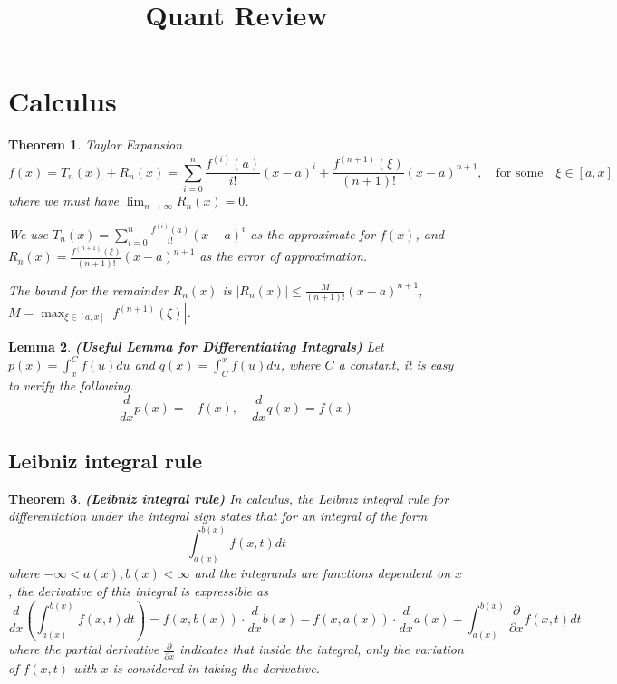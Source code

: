 \documentclass[13pt]{article}
\newtheorem{theorem}{Theorem}[section]
\newtheorem{lemma}[theorem]{Lemma}
\theoremstyle{definition}
\theoremstyle{remark}
\begin{document}
\begin{center}
\title{Quant Review}
    
    {}


\end{center}

\tableofcontents
\newpage

\vspace{2em}


\section{Calculus}
\begin{theorem} Taylor Expansion
    \[f(x) = T_n(x) + R_n(x) = \sum_{i=0}^{n} \frac{f^{(i)}(a)}{i!}(x-a)^i + \frac{f^{(n+1)}(\xi)}{(n+1)!}(x-a)^{n+1}, \quad \text{for some} \quad\xi\in [a, x]\]
    where we must have $\lim_{n\to \infty} R_n(x) = 0$.
    
    We use $T_n(x)=\sum_{i=0}^{n} \frac{f^{(i)}(a)}{i!}(x-a)^i$ as the approximate for $f(x)$, and $R_n(x)= \frac{f^{(n+1)}(\xi)}{(n+1)!}(x-a)^{n+1}$ as the error of approximation.
    
    The bound for the remainder $R_n(x)$ is $|R_n(x)| \le \frac{M}{(n+1)!}(x-a)^{n+1}$, $M = \max_{\xi\in[a,x]} |f^{(n+1)}(\xi)|$.
\end{theorem}
\begin{lemma}\label{lemma:Useful Lemma for Differentiating Integrals}\textbf{(Useful Lemma for Differentiating Integrals)}
Let $p(x)=\int_x^C f(u) d u$ and $q(x)=\int_C^x f(u) d u$, where $C$ a constant, it is easy to verify the following.
$$
\frac{d}{d x} p(x)=-f(x), \quad \frac{d}{d x} q(x)=f(x)
$$
\end{lemma}

\subsection{Leibniz integral rule}
\begin{theorem}\textbf{(Leibniz integral rule)}
In calculus, the Leibniz integral rule for differentiation under the integral sign states that for an integral of the form
$$
\int_{a(x)}^{b(x)} f(x, t) d t
$$
where $-\infty<a(x), b(x)<\infty$ and the integrands are functions dependent on $x$, the derivative of this integral is expressible as
$$
\frac{d}{d x}\left(\int_{a(x)}^{b(x)} f(x, t) d t\right) =f(x, b(x)) \cdot \frac{d}{d x} b(x)-f(x, a(x)) \cdot \frac{d}{d x} a(x)+\int_{a(x)}^{b(x)} \frac{\partial}{\partial x} f(x, t) d t
$$
where the partial derivative $\frac{\partial}{\partial x}$ indicates that inside the integral, only the variation of $f(x, t)$ with $x$ is considered in taking the derivative. 
\end{theorem}
\end{document}
